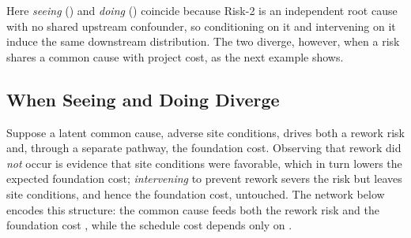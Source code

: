 \documentclass[
]{jss}
\begin{document}
Here \emph{seeing} () and \emph{doing}
() coincide because Risk-2 is an independent
root cause with no shared upstream confounder, so conditioning on it and
intervening on it induce the same downstream distribution. The two
diverge, however, when a risk shares a common cause with project cost,
as the next example shows.

\subsection{When Seeing and Doing
Diverge}\label{when-seeing-and-doing-diverge}

Suppose a latent common cause, adverse site conditions, drives both a
rework risk and, through a separate pathway, the foundation cost.
Observing that rework did \emph{not} occur is evidence that site
conditions were favorable, which in turn lowers the expected foundation
cost; \emph{intervening} to prevent rework severs the risk but leaves
site conditions, and hence the foundation cost, untouched. The network
below encodes this structure: the common cause  feeds both the
rework risk  and the foundation cost , while the
schedule cost  depends only on .
\end{document}
